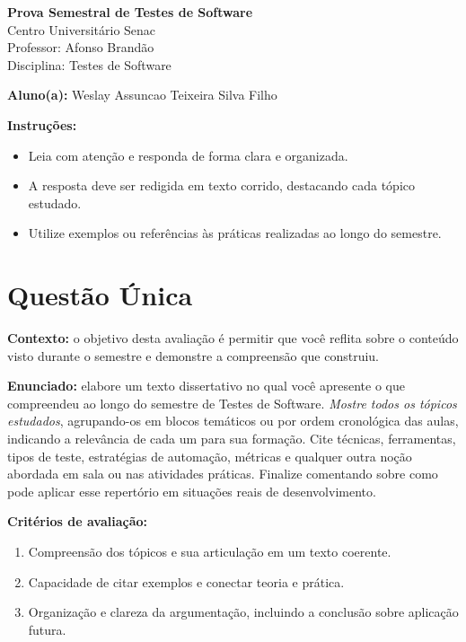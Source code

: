 \documentclass[12pt]{article}
\begin{document}
\newpage


\begin{center}
  {\Large \textbf{Prova Semestral de Testes de Software}}\\
  Centro Universitário Senac\\
  Professor: Afonso Brandão\\
  Disciplina: Testes de Software
\end{center}

\vspace{0.4cm}

\begin{center}
  \textbf{Aluno(a):} Weslay Assuncao Teixeira Silva Filho
\end{center}

\vspace{0.5cm}

\begin{center}
  \textbf{Instruções:}
\end{center}
\begin{itemize}[leftmargin=*]
  \item Leia com atenção e responda de forma clara e organizada.
  \item A resposta deve ser redigida em texto corrido, destacando cada tópico estudado.
  \item Utilize exemplos ou referências às práticas realizadas ao longo do semestre.
\end{itemize}

\section*{Questão Única}
\textbf{Contexto:} o objetivo desta avaliação é permitir que você reflita sobre o conteúdo visto durante o semestre e demonstre a compreensão que construiu.

\textbf{Enunciado:} elabore um texto dissertativo no qual você apresente o que compreendeu ao longo do semestre de Testes de Software. \textit{Mostre todos os tópicos estudados}, agrupando-os em blocos temáticos ou por ordem cronológica das aulas, indicando a relevância de cada um para sua formação. Cite técnicas, ferramentas, tipos de teste, estratégias de automação, métricas e qualquer outra noção abordada em sala ou nas atividades práticas. Finalize comentando sobre como pode aplicar esse repertório em situações reais de desenvolvimento.

\textbf{Critérios de avaliação:}
\begin{enumerate}[label=\arabic*.]
  \item Compreensão dos tópicos e sua articulação em um texto coerente.
  \item Capacidade de citar exemplos e conectar teoria e prática.
  \item Organização e clareza da argumentação, incluindo a conclusão sobre aplicação futura.
\end{enumerate}
\end{document}
